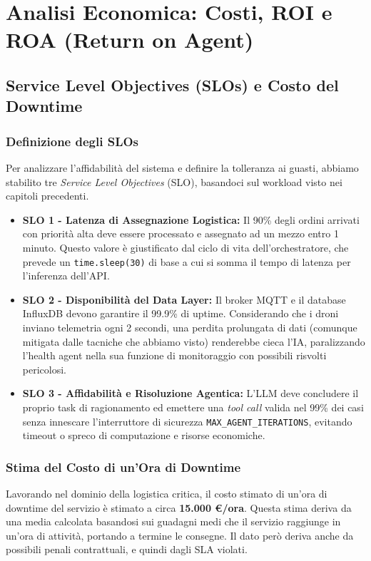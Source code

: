 
\chapter{Analisi Economica: Costi, ROI e ROA (Return on Agent)}
\label{cap:analisi_economica}

\section{Service Level Objectives (SLOs) e Costo del Downtime}
\label{sec:slo_downtime}
\subsection*{Definizione degli SLOs}
Per analizzare l'affidabilità del sistema e definire la tolleranza ai guasti, abbiamo stabilito tre \textit{Service Level Objectives} (SLO), basandoci sul workload visto nei capitoli precedenti. 
\begin{itemize}
    \item \textbf{SLO 1 - Latenza di Assegnazione Logistica:} Il 90\% degli ordini arrivati con priorità alta deve essere processato e assegnato ad un mezzo entro 1 minuto. Questo valore è giustificato dal ciclo di vita dell'orchestratore, che prevede un \texttt{time.sleep(30)} di base a cui si somma il tempo di latenza per l'inferenza dell'API.
    \item \textbf{SLO 2 - Disponibilità del Data Layer:} Il broker MQTT e il database InfluxDB devono garantire il 99.9\% di uptime. Considerando che i droni inviano telemetria ogni 2 secondi, una perdita prolungata di dati (comunque mitigata dalle tacniche che abbiamo visto) renderebbe cieca l'IA, paralizzando l'health agent nella sua funzione di monitoraggio con possibili risvolti pericolosi.
    \item \textbf{SLO 3 - Affidabilità e Risoluzione Agentica:} L'LLM deve concludere il proprio task di ragionamento ed emettere una \textit{tool call} valida nel 99\% dei casi senza innescare l'interruttore di sicurezza \texttt{MAX\_AGENT\_ITERATIONS}, evitando timeout o spreco di computazione e risorse economiche.
\end{itemize}
\subsection*{Stima del Costo di un'Ora di Downtime}
Lavorando nel dominio della logistica critica, il costo stimato di un'ora di downtime del servizio è stimato a circa \textbf{15.000 €/ora}. Questa stima deriva da una media calcolata basandosi sui guadagni medi che il servizio raggiunge in un'ora di attività, portando a termine le consegne. Il dato però deriva anche da possibili penali contrattuali, e quindi dagli SLA violati.


